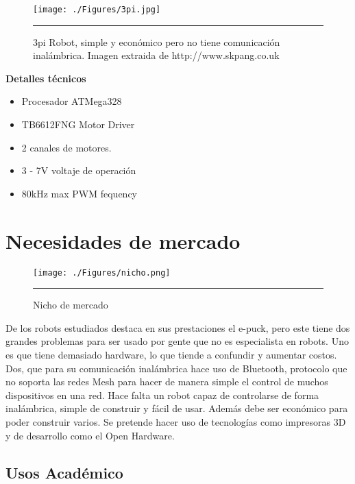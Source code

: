 \begin{figure}[htbp]
	\centering
		\texttt{[image: ./Figures/3pi.jpg]}
		\rule{35em}{0.5pt} 
	\caption[swarm]{3pi Robot, simple y económico pero no tiene comunicación inalámbrica. Imagen extraida de http://www.skpang.co.uk}
	\label{fig:3pi}
\end{figure}

\textbf{Detalles técnicos}
\begin{itemize}
\item Procesador ATMega328
\item TB6612FNG Motor Driver
\item 2 canales de motores.
\item 3 - 7V voltaje de operación
\item 80kHz max PWM fequency
\end{itemize}


\section{Necesidades de mercado}
\begin{figure}[htbp]
	\centering
		\texttt{[image: ./Figures/nicho.png]}
		\rule{35em}{0.5pt}
	\caption[nicho]{Nicho de mercado}
	\label{fig:nicho}
\end{figure}

De los robots estudiados destaca en sus prestaciones el e-puck, pero este tiene dos grandes problemas para ser usado por gente que no es especialista en robots. Uno es que tiene demasiado hardware, lo que tiende a confundir y aumentar costos. Dos, que para su comunicación inalámbrica hace uso de Bluetooth, protocolo que no soporta las redes Mesh para hacer de manera simple el control de muchos dispositivos en una red. Hace falta un robot capaz de controlarse de forma inalámbrica, simple de construir y fácil de usar. Además debe ser económico para poder construir varios. Se pretende hacer uso de tecnologías como impresoras 3D y  de desarrollo como el Open Hardware.



\subsection{Usos Académico}

